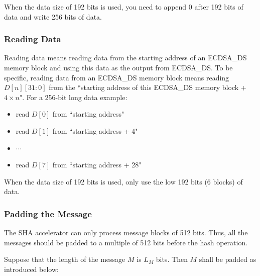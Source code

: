 \documentclass[main\_\_EN.tex]{subfiles}
\begin{document}
\begin{tiplisting}
When the data size of 192 bits is used, you need to append 0 after 192 bits of data and write 256 bits of data.
\end{tiplisting}

\subsubsection{Reading Data}

Reading data means reading data from the starting address of an ECDSA\_DS memory block and using this data as the output from ECDSA\_DS. To be specific, reading data from an ECDSA\_DS memory block means reading $D[n][31:0]$ from the ``starting address of this ECDSA\_DS memory block + $4 \times n$".
For a 256-bit long data example:
\begin{itemize}
    \item read $D[0]$ from ``starting address"
    \item read $D[1]$ from ``starting address + 4"
    \item $\cdots$
    \item read $D[7]$ from ``starting address + 28"
\end{itemize}

\begin{tiplisting}
When the data size of 192 bits is used, only use the low 192 bits (6 blocks) of data.
\end{tiplisting}

\subsubsection{Padding the Message}\label{sec:ecdsa-msg-padding}

The SHA accelerator can only process message blocks of 512 bits. Thus, all the messages should be padded to a multiple of 512 bits before the hash operation.

Suppose that the length of the message \begin{math}M\end{math} is \begin{math} L_M \end{math} bits. Then \begin{math} M \end{math} shall be padded as introduced below:
\end{document}
